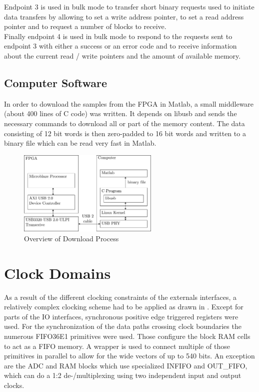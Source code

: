 Endpoint 3 is used in bulk mode to transfer short binary requests used to
initiate data transfers by allowing to set a write address pointer,
to set a read address pointer and to request a number of blocks to receive. \\

Finally endpoint 4 is used in bulk mode to respond to the requests sent
to endpoint 3 with either a success or an error code and to receive information
about the current read / write pointers and the amount of available memory. \\

\subsection{Computer Software}
In order to download the samples from the \gls{FPGA} in Matlab, a small
middleware (about 400 lines of C code) was written.
It depends on libusb  and sends the necessary commands
to download all or part of the memory content.
The data consisting of 12 bit words is then zero-padded to 16 bit words
and written to a binary file which can be read very fast in Matlab. \\

\begin{figure}[ht]
  \centering
  \includegraphics[width=0.6\textwidth]{figures/fpga_download}
  \caption{Overview of Download Process}
  \label{fig:fpga_download}
\end{figure}

\section{Clock Domains}
\label{sec:fpga_clocks}

As a result of the different clocking constraints of the externals interfaces,
a relatively complex clocking scheme had to be applied as drawn in
. Except for parts of the \gls{IO} interfaces,
synchronous positive edge triggered registers were used. For the synchronization
of the data paths crossing clock boundaries the numerous FIFO36E1 primitives
were used. Those configure the block \gls{RAM} cells to act as a \gls{FIFO}
memory. A wrapper is used to connect multiple of those primitives 
in parallel to allow for the wide vectors of up to 540 bits.
An exception are the \gls{ADC} and \gls{RAM} blocks which use
specialized \gls{INFIFO} and OUT\_FIFO, which can do a 1:2 de-/multiplexing
using two independent input and output clocks. \\


